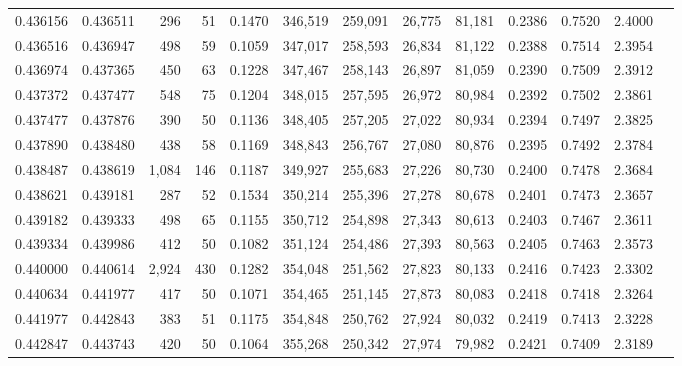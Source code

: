 \begin{tabular}{rrrrrrrrrrrrr}
0.436156 & 0.436511 &   296 &  51 &                                     0.1470 & 346,519 & 259,091 &  26,775 &  81,181 & 0.2386 & 0.7520 & 2.4000 \\
0.436516 & 0.436947 &   498 &  59 &                                     0.1059 & 347,017 & 258,593 &  26,834 &  81,122 & 0.2388 & 0.7514 & 2.3954 \\
0.436974 & 0.437365 &   450 &  63 &                                     0.1228 & 347,467 & 258,143 &  26,897 &  81,059 & 0.2390 & 0.7509 & 2.3912 \\
0.437372 & 0.437477 &   548 &  75 &                                     0.1204 & 348,015 & 257,595 &  26,972 &  80,984 & 0.2392 & 0.7502 & 2.3861 \\
0.437477 & 0.437876 &   390 &  50 &                                     0.1136 & 348,405 & 257,205 &  27,022 &  80,934 & 0.2394 & 0.7497 & 2.3825 \\
0.437890 & 0.438480 &   438 &  58 &                                     0.1169 & 348,843 & 256,767 &  27,080 &  80,876 & 0.2395 & 0.7492 & 2.3784 \\
0.438487 & 0.438619 & 1,084 & 146 &                                     0.1187 & 349,927 & 255,683 &  27,226 &  80,730 & 0.2400 & 0.7478 & 2.3684 \\
0.438621 & 0.439181 &   287 &  52 &                                     0.1534 & 350,214 & 255,396 &  27,278 &  80,678 & 0.2401 & 0.7473 & 2.3657 \\
0.439182 & 0.439333 &   498 &  65 &                                     0.1155 & 350,712 & 254,898 &  27,343 &  80,613 & 0.2403 & 0.7467 & 2.3611 \\
0.439334 & 0.439986 &   412 &  50 &                                     0.1082 & 351,124 & 254,486 &  27,393 &  80,563 & 0.2405 & 0.7463 & 2.3573 \\
0.440000 & 0.440614 & 2,924 & 430 &                                     0.1282 & 354,048 & 251,562 &  27,823 &  80,133 & 0.2416 & 0.7423 & 2.3302 \\
0.440634 & 0.441977 &   417 &  50 &                                     0.1071 & 354,465 & 251,145 &  27,873 &  80,083 & 0.2418 & 0.7418 & 2.3264 \\
0.441977 & 0.442843 &   383 &  51 &                                     0.1175 & 354,848 & 250,762 &  27,924 &  80,032 & 0.2419 & 0.7413 & 2.3228 \\
0.442847 & 0.443743 &   420 &  50 &                                     0.1064 & 355,268 & 250,342 &  27,974 &  79,982 & 0.2421 & 0.7409 & 2.3189 \\

\end{tabular}
